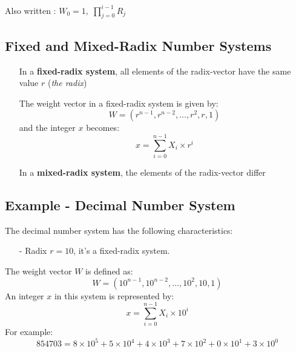\documentclass[12pt,openany]{book}
\begin{document}
	Also written :
	$W_{0} = 1, \; \prod_{j=0}^{i-1} R_{j}$
	
	\subsection{Fixed and Mixed-Radix Number Systems}
	\begin{itemize}
		\item[] In a \textbf{fixed-radix system}, all elements of the radix-vector have the same value \( r \) (\textit{the radix})
		\item[] The weight vector in a fixed-radix system is given by:
		      \begin{equation*}
		      	W = \left( r^{n-1}, r^{n-2}, \ldots, r^2, r, 1 \right)
		      \end{equation*}
		      and the integer \( x \) becomes:
		      \begin{equation*}
		      	x = \sum_{i=0}^{n-1} X_i \times r^i
		      \end{equation*}
		\item[] In a \textbf{mixed-radix system}, the elements of the radix-vector differ
	\end{itemize}
	\subsection*{Example - Decimal Number System}
	The decimal number system has the following characteristics:
	\begin{itemize}
		\item[-] Radix \(r = 10\), it's a fixed-radix system.
	\end{itemize}
	The weight vector \(W\) is defined as:
	\begin{equation*}
		W = \left(10^{n-1}, 10^{n-2}, \ldots, 10^2, 10, 1\right)
	\end{equation*}
	An integer \(x\) in this system is represented by:
	\begin{equation*}
		x = \sum_{i=0}^{n-1} X_i \times 10^i
	\end{equation*}
	For example:
	\begin{equation*}
		854703 = 8 \times 10^5 + 5 \times 10^4 + 4 \times 10^3 + 7 \times 10^2 + 0 \times 10^1 + 3 \times 10^0
	\end{equation*}
	
\end{document}
